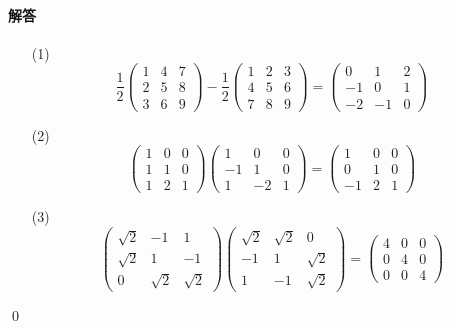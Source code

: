 \paragraph{解答}
\begin{itemize}
\item[(1)]
\[
\frac{1}{2}
\begin{pmatrix}
1 & 4 & 7 \\
2 & 5 & 8 \\
3 & 6 & 9
\end{pmatrix}
- \frac{1}{2}
\begin{pmatrix}
1 & 2 & 3 \\
4 & 5 & 6 \\
7 & 8 & 9
\end{pmatrix}
=
\begin{pmatrix}
0 & 1 & 2 \\
-1 & 0 & 1 \\
-2 & -1 & 0
\end{pmatrix}
\]
\item[(2)]
\[
\begin{pmatrix}
1 & 0 & 0 \\
1 & 1 & 0 \\
1 & 2 & 1
\end{pmatrix}
\begin{pmatrix}
1 & 0 & 0 \\
-1 & 1 & 0 \\
1 & -2 & 1
\end{pmatrix}
=
\begin{pmatrix}
1 & 0 & 0 \\
0 & 1 & 0 \\
-1 & 2 & 1
\end{pmatrix}
\]
\item[(3)]
\[
\begin{pmatrix}
\sqrt{2} & -1 & 1 \\
\sqrt{2} & 1 & -1 \\
0 & \sqrt{2} & \sqrt{2}
\end{pmatrix}
\begin{pmatrix}
\sqrt{2} & \sqrt{2} & 0 \\
-1 & 1 & \sqrt{2} \\
1 & -1 & \sqrt{2}
\end{pmatrix}
= 
\begin{pmatrix}
4 & 0 & 0 \\
0 & 4 & 0 \\
0 & 0 & 4
\end{pmatrix}
\]
\end{itemize}
\qed

